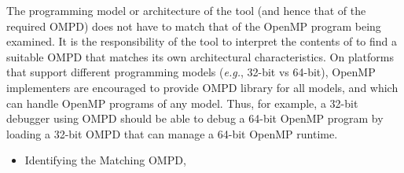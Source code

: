 The programming model or architecture of the tool (and hence
that of the required OMPD) does not have to match that of the OpenMP program
being examined.
It is the responsibility of the tool to interpret the contents
of  to find a suitable OMPD that matches
its own architectural characteristics.
On platforms that support different programming models
(\textit{e.g.}, 32-bit vs 64-bit), OpenMP implementers are encouraged
to provide OMPD library for all models, and which can handle
OpenMP programs of any model.
Thus, for example, a 32-bit debugger using OMPD should be able
to debug a 64-bit OpenMP program
by loading a 32-bit OMPD that can manage a 64-bit OpenMP runtime.

\crossreferences
\begin{itemize}
	\item Identifying the Matching OMPD, 
\end{itemize}



